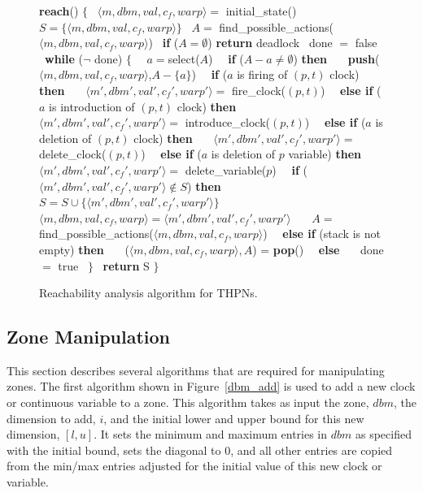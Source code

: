 \documentclass[11pt,times]{article}
\begin{document}
\begin{figure}[htbp]
\begin{algorithm}
\small {\bf{reach}}() $\{$
\ $\langle m,dbm,val,c_f,warp \rangle =$ initial\_state()
\ $S = \{ \langle m,dbm,val,c_f,warp \rangle \}$
\ $A =$ find\_possible\_actions($\langle m,dbm,val,c_f,warp \rangle$)
\ {\bf{if}} ($A = \emptyset$) {\bf{return}} deadlock
\ done $=$ false
\ {\bf{while}} ($\neg$ done) $\{$
\ \ $a = $select($A$)
\ \ {\bf{if}} ($A - {a} \not= \emptyset$) {\bf{then}}
\ \ \ {\bf{push}}($\langle m,dbm,val,c_f,warp \rangle$,$A-\{a\}$)
\ \ {\bf{if}} ($a$ is firing of $(p,t)$ clock) {\bf{then}}
\ \ \ $\langle m',dbm',val',c_f',warp' \rangle =$ fire\_clock($(p,t)$)
\ \ {\bf{else if}} ($a$ is introduction of $(p,t)$ clock) {\bf{then}}
\ \ \ $\langle m',dbm',val',c_f',warp' \rangle =$ introduce\_clock($(p,t)$)
\ \ {\bf{else if}} ($a$ is deletion of $(p,t)$ clock) {\bf{then}}
\ \ \ $\langle m',dbm',val',c_f',warp' \rangle =$ delete\_clock($(p,t)$)
\ \ {\bf{else if}} ($a$ is deletion of $p$ variable) {\bf{then}}
\ \ \ $\langle m',dbm',val',c_f',warp' \rangle =$ delete\_variable($p$)
\ \ {\bf{if}} ($\langle m',dbm',val',c_f',warp' \rangle \not\in S$) {\bf{then}}
\ \ \ $S = S \cup \{ \langle m',dbm',val',c_f',warp' \rangle \}$
\ \ \ $\langle m,dbm,val,c_f,warp \rangle = \langle m',dbm',val',c_f',warp' \rangle$
\ \ \ $A =$ find\_possible\_actions($\langle m,dbm,val,c_f,warp \rangle$)
\ \ {\bf{else if}} (stack is not empty) {\bf{then}}
\ \ \ ($\langle m,dbm,val,c_f,warp \rangle, A$) = {\bf{pop}}()
\ \ {\bf{else}}
\ \ \ done $=$ true
\ $\}$
\ {\bf{return}} S 
$\}$
\end{algorithm}
\caption{\label{analysis_algm}Reachability analysis algorithm for THPNs.}
\end{figure}

\subsection{Zone Manipulation}

This section describes several algorithms that are required for manipulating
zones.  The first algorithm shown in Figure~\ref{dbm_add} is used to add a new 
clock or continuous variable to a zone.  This algorithm takes as input the
zone, $dbm$, the dimension to add, $i$, and the initial lower and upper bound
for this new dimension, $[l,u]$.  It sets the minimum and maximum entries in
$dbm$ as specified with the initial bound, sets the diagonal to 0, and all 
other entries are copied from the min/max entries adjusted for the initial
value of this new clock or variable. 
\end{document}
